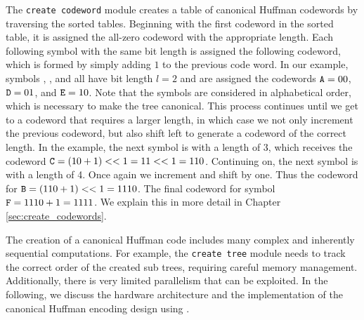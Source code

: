 The \lstinline{create codeword} module creates a table of canonical Huffman codewords by traversing the sorted tables. Beginning with the first codeword in the sorted table, it is assigned the all-zero codeword with the appropriate length.  Each following symbol with the same bit length is assigned the following codeword, which is formed by simply adding $1$ to the previous code word.  In our example, symbols , , and  all have bit length $l = 2$ and are assigned the codewords $\texttt{A} = 00$, $\texttt{D} = 01$, and $\texttt{E} = 10$.  Note that the symbols are considered in alphabetical order, which is necessary to make the tree canonical.  This process continues until we get to a codeword that requires a larger length, in which case we not only increment the previous codeword, but also shift left to generate a codeword of the correct length.  In the example, the next symbol is  with a length of 3, which receives the codeword $\texttt{C} = (10 + 1) << 1 = 11 << 1 = 110$. Continuing on, the next symbol is  with a length of 4.  Once again we increment and shift by one. Thus the codeword for $\texttt{B} = (110 + 1) << 1 = 1110$. The final codeword for symbol $\texttt{F} = 1110 + 1 = 1111$. We explain this in more detail in Chapter \ref{sec:create_codewords}.  


The creation of a canonical Huffman code includes many complex and inherently sequential computations. For example, the \lstinline{create tree} module needs to track the correct order of the created sub trees, requiring careful memory management. Additionally, there is very limited parallelism that can be exploited. In the following, we discuss the hardware architecture and the implementation of the canonical Huffman encoding design using \VHLS. 

